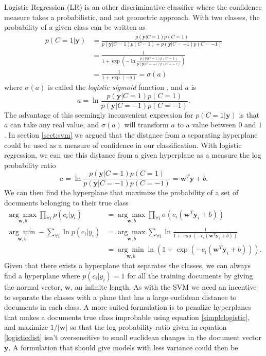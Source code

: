 Logistic Regression (LR) is an other discriminative classifier where the confidence measure takes a probabilistic, and not geometric approach. With two classes, the probability of a given class can be written as
\begin{align}
p(C = 1| \mathbf{y}) &= \frac{p(\mathbf{y}|C = 1)p(C = 1)}{p(\mathbf{y}|C=1)p(C=1)+p(\mathbf{y}|C=-1)p(C=-1)} \nonumber \\
&= \frac{1}{1+\exp(-\ln\frac{p(\mathbf{y}|C = 1)p(C=1)}{p(\mathbf{y}|C=-1)p(C=-1)})} \nonumber \\
&= \frac{1}{1+\exp(-a)} = \sigma(a) \label{logisticsigmoid}
\end{align}
where $\sigma(a)$ is called the \emph{logistic sigmoid} function \cite[p. 197]{machinelearningbook}, and $a$ is
\begin{equation}
\label{logistica}
a = \ln \frac{p(\mathbf{y}|C = 1)p(C=1)}{p(\mathbf{y}|C=-1)p(C=-1)}.
\end{equation}
The advantage of this seemingly inconvenient expression for $p(C=1 | \mathbf{y})$ is that $a$ can take any real value, and $\sigma(a)$ will transform $a$ to a value between $0$ and $1$. In section \ref{sect:svm} we argued that the distance from a separating hyperplane could be used as a measure of confidence in our classification.  With logistic regression, we can use this distance from a given hyperplane as a measure the log probability ratio \cite[p. 205]{machinelearningbook}
\begin{equation}
\label{logisticdist}
a = \ln \frac{p(\mathbf{y}|C=1)p(C=1)}{p(\mathbf{y}|C=-1)p(C=-1)} = \mathbf{w}^T\mathbf{y}+b.
\end{equation}
We can then find the hyperplane that maximize the probability of a set of documents belonging to their true class
\begin{align}
\underset{\mathbf{w}, b}{\arg \max} \prod_{\forall i} p(c_i | y_i)  &= 
\underset{\mathbf{w}, b}{\arg \max} \prod_{\forall i} \sigma(c_i(\mathbf{w}^T\mathbf{y}_i+b)) \nonumber \\
\underset{\mathbf{w}, b}{\arg \min} -\sum_{\forall i} \ln p(c_i | y_i) &= 
\underset{\mathbf{w}, b}{\arg \max} \sum_{\forall i} \ln \frac{1}{1+\exp(-c_i(\mathbf{w}^T\mathbf{y}_i+b))} \nonumber \\
&= \underset{\mathbf{w}, b}{\arg \min} \ln(1+\exp(-c_i(\mathbf{w}^T\mathbf{y}_i+b))). \label{simplelogistic}
\end{align}
Given that there exists a hyperplane that separates the classes, we can always find a hyperplane where $p(c_i | y_i) = 1$ for all the training documents by giving the normal vector, $\mathbf{w}$, an infinite length. As with the SVM we need an incentive to separate the classes with a plane that has a large euclidean distance to documents in each class. A more suited formulation is to penalize hyperplanes that makes a documents true class improbable using equation \ref{simplelogistic}, and maximize $1/|\mathbf{w}|$ so that the log probability ratio given in equation \ref{logisticdist} isn't oversensitive to small euclidean changes in the document vector $\mathbf{y}$. A formulation that should give models with less variance could then be \cite{liblinear}
